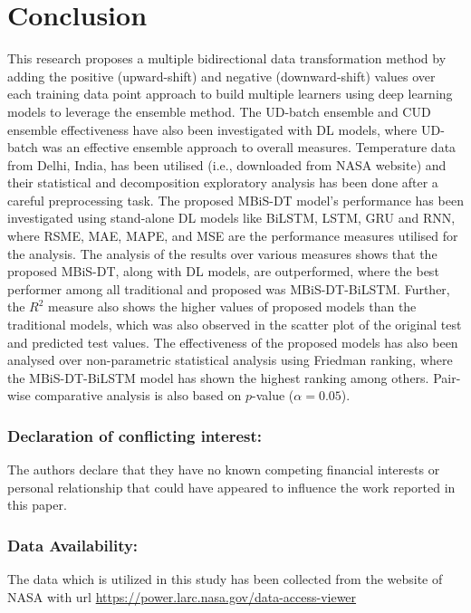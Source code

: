 
\chapter{Conclusion} %

\label{c6} %


This research proposes a multiple bidirectional data transformation method by adding the positive (upward-shift) and negative (downward-shift) values over each training data point approach to build multiple learners using deep learning models to leverage the ensemble method. The UD-batch ensemble and CUD ensemble effectiveness have also been investigated with DL models, where UD-batch was an effective ensemble approach to overall measures. Temperature data from Delhi, India, has been utilised (i.e., downloaded from NASA website) and their statistical and decomposition exploratory analysis has been done after a careful preprocessing task.
The proposed MBiS-DT model's performance has been investigated using stand-alone DL models like BiLSTM, LSTM, GRU and RNN, where RSME, MAE, MAPE, and MSE are the performance measures utilised for the analysis. The analysis of the results over various measures shows that the proposed MBiS-DT, along with DL models, are outperformed, where the best performer among all traditional and proposed was MBiS-DT-BiLSTM. Further, the $R^2$ measure also shows the higher values of proposed models than the traditional models, which was also observed in the scatter plot of the original test and predicted test values. The effectiveness of the proposed models has also been analysed over non-parametric statistical analysis using Friedman ranking, where the MBiS-DT-BiLSTM model has shown the highest ranking among others. Pair-wise comparative analysis is also based on $p$-value ($\alpha=0.05$).

\subsection*{Declaration of conflicting interest:} The authors declare that they have no known competing financial interests or personal relationship that could have appeared to influence the work reported in this paper. 
\subsection*{Data Availability: } The data which is utilized in this study has been collected from the website of NASA with url \href{https://power.larc.nasa.gov/data-access-viewer/}{https://power.larc.nasa.gov/data-access-viewer} \cite{nasa}


